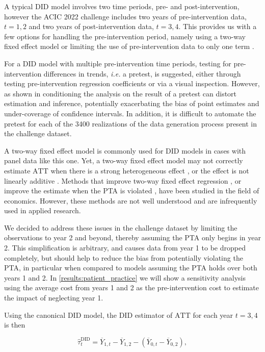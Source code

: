 \documentclass[twoside,11pt]{article}
\makeatletter
\newcommand*{\DID}{\ensuremath{\text{DID}}\xspace}
\newcommand*{\ATT}{\ensuremath{\text{ATT}}\xspace}
\newcommand*{\ie}{\textit{i.e.}\@\xspace}
\makeatother
\begin{document}
A typical \DID model involves two time periods, pre- and post-intervention,
however the ACIC 2022 challenge includes
two years of pre-intervention data, $t=1,2$ and
two years of post-intervention data, $t=3,4$.
This provides us with a few options for handling the pre-intervention period,
namely using a two-way fixed effect model
or limiting the use of pre-intervention data to only one term \cite{egami_yamauchi_2022}.

For a \DID model with multiple pre-intervention time periods,
testing for pre-intervention differences in trends, \ie a pretest, is suggested,
either through testing pre-intervention regression coefficients or via a visual inspection.
However, as shown in \cite{10.1257/aeri.20210236}
conditioning the analysis on the result of a pretest can distort estimation and inference,
potentially exacerbating the bias of point estimates and under-coverage of confidence intervals.
In addition, it is difficult to automate the pretest
for each of the \num{3400} realizations of the data generation process present in the challenge dataset.

A two-way fixed effect model is commonly used for \DID models in cases with panel data like this one.
Yet, a two-way fixed effect model may not correctly estimate \ATT when
there is a strong heterogeneous effect \cite{10.1257/aer.20181169},
or the effect is not linearly additive \cite{imai_kim_2021}.
Methods that improve two-way fixed effect regression \cite{egami_yamauchi_2022},
or improve the estimate when the PTA is violated \cite{Rambachan2019AnHA},
have been studied in the field of economics.
However, these methods are not well understood and are infrequently used in applied research.

We decided to address these issues in the challenge dataset
by limiting the observations to year 2 and beyond,
thereby assuming the PTA only begins in year 2.
This simplification is arbitrary, and causes data from year 1 to be dropped completely,
but should help to reduce the bias from potentially violating the PTA,
in particular when compared to models assuming the PTA holds over both years 1 and 2.
In \cref{results:patient_practice} we will show a sensitivity analysis
using the average cost from years 1 and 2 as the pre-intervention cost
to estimate the impact of neglecting year 1.

Using the canonical \DID model, the \DID estimator of \ATT for each year $t=3,4$ is then

\begin{equation}\label{eq:DID_ATT_t}
\hat{\tau}_{t}^{\DID} = \overline{Y}_{1,t} - \overline{Y}_{1,2} - \left(\overline{Y}_{0,t} - \overline{Y}_{0,2}\right),
\end{equation}
\end{document}
